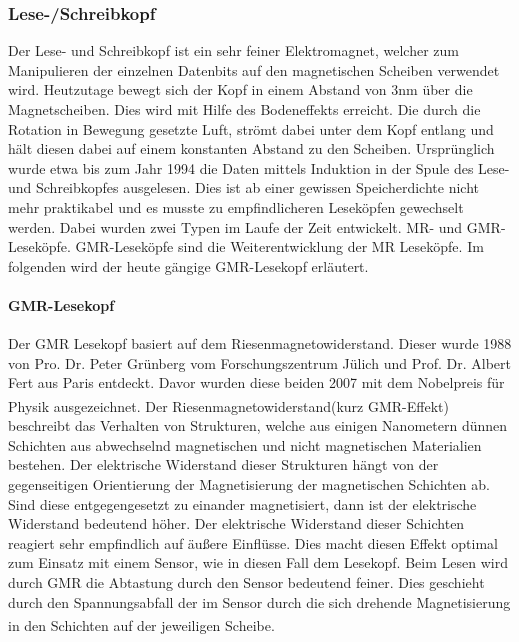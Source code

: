 \documentclass[a4paper, DIV20, 12pt, headsepline, parskip, flushleft]{scrartcl}
\begin{document}
\subsubsection{Lese-/Schreibkopf}
Der Lese- und Schreibkopf ist ein sehr feiner Elektromagnet, welcher zum Manipulieren der einzelnen Datenbits auf den magnetischen Scheiben verwendet wird. Heutzutage bewegt sich der Kopf in einem Abstand von 3nm über die Magnetscheiben. Dies wird mit Hilfe des Bodeneffekts erreicht. Die durch die Rotation in Bewegung gesetzte Luft, strömt dabei unter dem Kopf entlang und hält diesen dabei auf einem konstanten Abstand zu den Scheiben.
Ursprünglich wurde etwa bis zum Jahr 1994 die Daten mittels Induktion in der Spule des Lese- und Schreibkopfes ausgelesen. Dies ist ab einer gewissen Speicherdichte nicht mehr praktikabel und es musste zu empfindlicheren Leseköpfen gewechselt werden. Dabei wurden zwei Typen im Laufe der Zeit entwickelt. MR- und GMR-Leseköpfe.
GMR-Leseköpfe sind die Weiterentwicklung der MR Leseköpfe. Im folgenden wird der heute gängige GMR-Lesekopf erläutert.
\paragraph{GMR-Lesekopf}
Der GMR Lesekopf basiert auf dem Riesenmagnetowiderstand. Dieser wurde 1988 von Pro. Dr. Peter Grünberg vom Forschungszentrum Jülich und Prof. Dr. Albert Fert aus Paris entdeckt. Davor wurden diese beiden 2007 mit dem Nobelpreis für Physik ausgezeichnet.\textsuperscript{\cite{nbp}}
Der Riesenmagnetowiderstand(kurz GMR-Effekt) beschreibt das Verhalten von Strukturen, welche aus einigen Nanometern dünnen Schichten aus abwechselnd magnetischen und nicht magnetischen Materialien bestehen. Der elektrische Widerstand dieser Strukturen hängt von der gegenseitigen Orientierung der Magnetisierung der magnetischen Schichten ab. Sind diese entgegengesetzt zu einander magnetisiert, dann ist der elektrische Widerstand bedeutend höher. Der elektrische Widerstand dieser Schichten reagiert sehr empfindlich auf äußere Einflüsse. Dies macht diesen Effekt optimal zum Einsatz mit einem Sensor, wie in diesen Fall dem Lesekopf.
Beim Lesen wird durch GMR die Abtastung durch den Sensor bedeutend feiner. Dies geschieht durch den Spannungsabfall der im Sensor durch die sich drehende Magnetisierung in den Schichten auf der jeweiligen Scheibe. \textsuperscript{\cite{gmr} \cite{nbp}}
\end{document}
